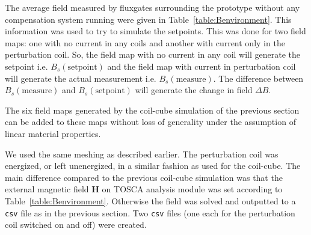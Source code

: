 The average field measured by fluxgates surrounding the prototype
without any compensation system running were given in
Table~\ref{table:Benvironment}.  This information was used to try to
simulate the setpoints.  This was done for two field maps: one with no
current in any coils and another with current only in the perturbation
coil.  So, the field map with no current in any coil will generate the
setpoint i.e. $B_s(\text{setpoint})$ and the field map with current in
perturbation coil will generate the actual measurement
i.e. $B_s(\text{measure})$. The difference between
$B_s(\text{measure})$ and $B_s(\text{setpoint})$ will generate the
change in field $\Delta B$.

The six field maps generated by the coil-cube simulation of the
previous section can be added to these maps without loss of generality
under the assumption of linear material properties.

We used the same meshing as described earlier.  The perturbation coil
was energized, or left unenergized, in a similar fashion as used for
the coil-cube.  
The main difference compared to the previous coil-cube simulation was
that the external magnetic field $\bm{H}$ on TOSCA analysis module was
set according to Table~\ref{table:Benvironment}.
Otherwise the field was solved and outputted to a {\tt csv} file as in the previous
section.  Two {\tt csv} files (one each for the perturbation coil
switched on and off) were created.

